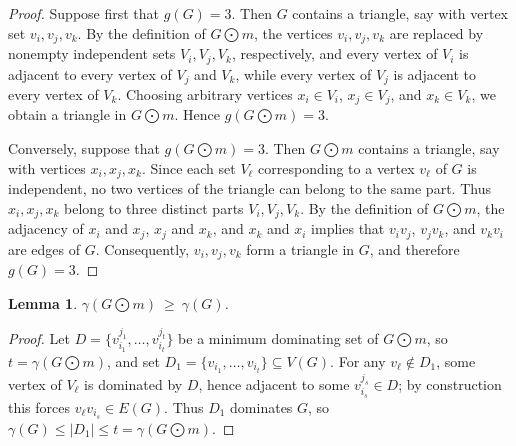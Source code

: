\documentclass[12pt]{amsart}
\theoremstyle{plain}
\newtheorem{lemma}[theorem]{Lemma}
\theoremstyle{definition}
\begin{document}
\begin{proof}
Suppose first that $g(G)=3$. Then $G$ contains a triangle, say with vertex set ${v_i,v_j,v_k}$. By the definition of $G\bigodot m$, the vertices $v_i,v_j,v_k$ are replaced by nonempty independent sets $V_i,V_j,V_k$, respectively, and every vertex of $V_i$ is adjacent to every vertex of $V_j$ and $V_k$, while every vertex of $V_j$ is adjacent to every vertex of $V_k$. Choosing arbitrary vertices $x_i\in V_i$, $x_j\in V_j$, and $x_k\in V_k$, we obtain a triangle in $G\bigodot m$. Hence $g(G\bigodot m)=3$.

Conversely, suppose that $g(G\bigodot m)=3$. Then $G\bigodot m$ contains a triangle, say with vertices $x_i,x_j,x_k$. Since each set $V_\ell$ corresponding to a vertex $v_\ell$ of $G$ is independent, no two vertices of the triangle can belong to the same part. Thus $x_i,x_j,x_k$ belong to three distinct parts $V_i,V_j,V_k$. By the definition of $G\bigodot m$, the adjacency of $x_i$ and $x_j$, $x_j$ and $x_k$, and $x_k$ and $x_i$ implies that $v_i v_j$, $v_jv_k$, and $v_kv_i$ are edges of $G$. Consequently, $v_i,v_j,v_k$ form a triangle in $G$, and therefore $g(G)=3$.
\end{proof}

\begin{lemma}\label{Lemma;Dom(GOm)geDom(G)}
$\gamma(G\bigodot m)\ \geq\ \gamma(G)$.
\end{lemma}

\begin{proof}
Let $D=\{v_{i_1}^{j_1},\ldots,v_{i_t}^{j_t}\}$ be a minimum dominating set of $G\bigodot m$, so $t=\gamma(G\bigodot m)$, and set $D_1=\{v_{i_1},\ldots,v_{i_t}\}\subseteq V(G)$. For any $v_\ell\notin D_1$, some vertex of $V_\ell$ is dominated by $D$, hence adjacent to some $v_{i_s}^{j_s}\in D$; by construction this forces $v_\ell v_{i_s}\in E(G)$. Thus $D_1$ dominates $G$, so $\gamma(G)\leq |D_1|\leq t=\gamma(G\bigodot m)$.
\end{proof}
\end{document}

